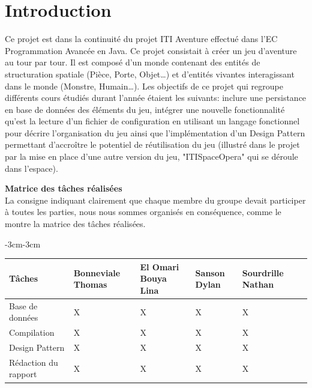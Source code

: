 \chapter{Introduction}

Ce projet est dans la continuité du projet ITI Aventure effectué dans l’EC Programmation Avancée en Java. Ce projet consistait à créer un jeu d’aventure au tour par tour. Il est composé d’un monde contenant des entités de structuration spatiale (Pièce, Porte, Objet…) et d’entités vivantes interagissant dans le monde (Monstre, Humain…).
Les objectifs de ce projet qui regroupe différents cours étudiés durant l'année étaient les suivants: inclure une persistance en base de données des éléments du jeu, intégrer une nouvelle fonctionnalité qu'est la lecture d'un fichier de configuration en utilisant un langage fonctionnel pour décrire l'organisation du jeu ainsi que l'implémentation d'un Design Pattern permettant d'accroître le potentiel de réutilisation du jeu (illustré dans le projet par la mise en place d'une autre version du jeu, "ITISpaceOpera" qui se déroule dans l'espace).
\vspace{0.5cm}

\textbf{Matrice des tâches réalisées}\\
La consigne indiquant clairement que chaque membre du groupe devait participer à toutes les parties, nous nous sommes organisés en conséquence, comme le montre la matrice des tâches réalisées.
\begin{table}[ht]
\begin{adjustwidth}{-3cm}{-3cm}
\centering
\begin{tabular}{|p{2.2cm}|p{2.2cm}|p{2.2cm}|p{2.2cm}|p{2.2cm}|p{2.2cm}|}
\hline
\textbf{Tâches} & \textbf{Bonneviale Thomas} & \textbf{El Omari Bouya Lina} & \textbf{Sanson Dylan} & \textbf{Sourdrille Nathan} \\
\hline
Base de données & X & X & X & X \\
\hline
Compilation & X & X & X & X \\
\hline
Design Pattern & X & X & X & X \\
\hline
Rédaction du rapport & X & X & X & X \\
\hline

\end{tabular}
\end{adjustwidth}
\end{table}
